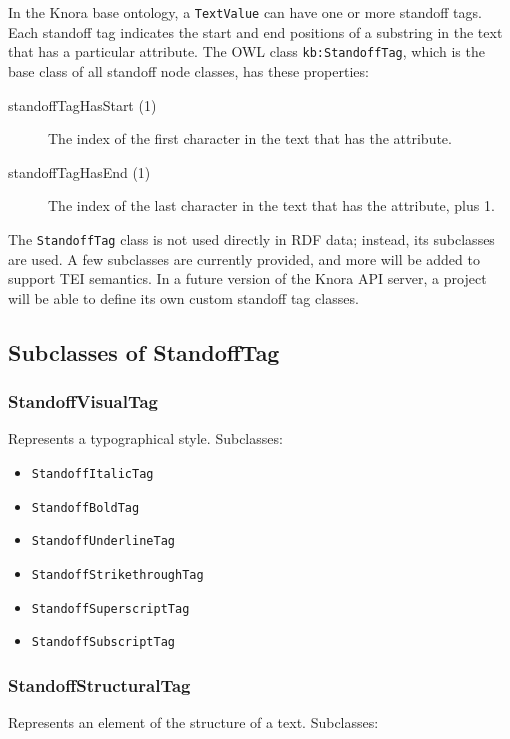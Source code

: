 \documentclass[12pt, a4paper]{article}
\begin{document}
In the Knora base ontology, a \texttt{TextValue} can have one or more standoff tags. Each standoff tag indicates the start and end positions of a substring in the text that has a particular attribute. The OWL class \texttt{kb:StandoffTag}, which is the base class of all standoff node classes, has these properties:

\begin{description}
	\item[standoffTagHasStart (1)] The index of the first character in the text that has the attribute.
	\item[standoffTagHasEnd (1)] The index of the last character in the text that has the attribute, plus 1.
\end{description}

The \texttt{StandoffTag} class is not used directly in RDF data; instead, its subclasses are used. A few subclasses are currently provided, and more will be added to support TEI semantics. In a future version of the Knora API server, a project will be able to define its own custom standoff tag classes.

\subsection{Subclasses of StandoffTag}

\subsubsection{StandoffVisualTag}

Represents a typographical style. Subclasses:

\begin{itemize}
	\item \texttt{StandoffItalicTag}
	\item \texttt{StandoffBoldTag}
	\item \texttt{StandoffUnderlineTag}
	\item \texttt{StandoffStrikethroughTag}
	\item \texttt{StandoffSuperscriptTag}
	\item \texttt{StandoffSubscriptTag}
\end{itemize}

\subsubsection{StandoffStructuralTag}

Represents an element of the structure of a text. Subclasses:
\end{document}
